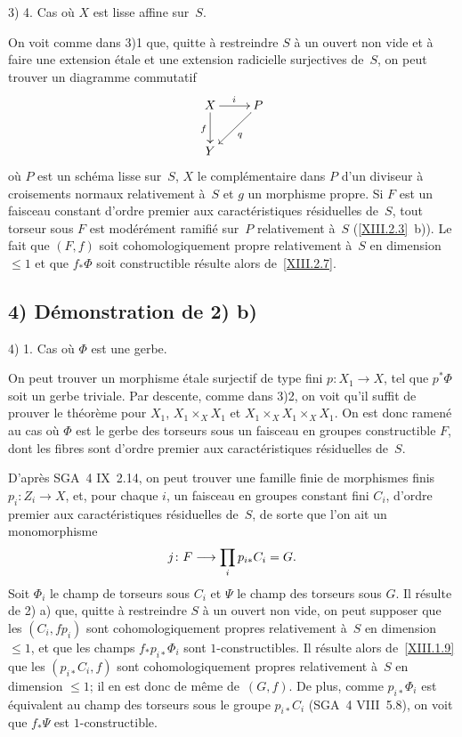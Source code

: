 3) 4. Cas o\`u $X$ est lisse affine sur~$S$.

On voit comme dans 3)1 que, quitte \`a restreindre $S$ \`a un
ouvert non vide et \`a faire une extension \'etale et une
extension radicielle surjectives de~$S$, on peut trouver un diagramme
commutatif
$$
\xymatrix{{X}\ar[r]^{i}\ar[d]_{f}&{P}\ar[ld]^{q}\\{Y}}
$$
o\`u $P$ est un sch\'ema lisse sur~$S$, $X$ le compl\'ementaire
dans $P$ d'un diviseur \`a croisements normaux relativement \`a~$S$ et $g$ un morphisme propre. Si $F$ est un faisceau constant
d'ordre premier aux caract\'eristiques r\'esiduelles de~$S$, tout
torseur sous $F$ est mod\'er\'ement ramifi\'e sur~$P$
relativement \`a~$S$ (\ref{XIII.2.3}~b)). Le fait que $(F,f)$ soit
cohomologiquement propre relativement \`a~$S$ en dimension $\le 1$
et que $f_*\Phi$ soit constructible r\'esulte alors
de~\ref{XIII.2.7}.

\subsection*{4) D\'emonstration de 2) b)}

4) 1. Cas o\`u $\Phi$ est une gerbe.

On peut trouver un morphisme \'etale surjectif de type fini $p
\colon X_1 \to X$, tel que $p^*\Phi$ soit un gerbe triviale. Par
descente, comme dans 3)2, on voit qu'il suffit de prouver le
th\'eor\`eme pour $X_1$, $X_1\times_X X_1$ et
$X_1\times_X X_1\times_X X_1$. On est donc ramen\'e au cas o\`u
$\Phi$ est le gerbe des torseurs sous un faisceau en groupes
constructible $F$, dont les fibres sont d'ordre premier aux
caract\'eristiques r\'esiduelles de~$S$.

D'apr\`es SGA~4 IX~2.14, on peut trouver une famille finie de
morphismes finis $p_i \colon Z_i \to X$, et, pour chaque $i$, un
faisceau en groupes constant fini $C_i$, d'ordre premier aux
caract\'eristiques r\'esiduelles de~$S$, de sorte que l'on ait un
monomorphisme
$$
j\colon F \to \prod_{i} p_{i*}C_i=G \quoi.
$$
Soit $\Phi_i$ le champ de torseurs sous $C_i$ et $\Psi$ le champ des
torseurs sous $G$. Il r\'esulte de 2) a) que, quitte \`a
restreindre $S$ \`a un ouvert non vide, on peut supposer que les
$(C_i,fp_i)$ sont cohomologiquement propres relativement \`a~$S$ en
dimension $\le 1$, et que les champs $f_*p_{i*}\Phi_i$ sont
$1$-constructibles. Il r\'esulte alors de~\ref{XIII.1.9} que les
$(p_{i*}C_i,f)$ sont cohomologiquement propres relativement \`a~$S$
en dimension $\le 1$; il en est donc de m\^eme de~$(G,f)$. De plus,
comme $p_{i*}\Phi_i$ est \'equivalent au champ des torseurs sous le
groupe $p_{i*}C_i$ (SGA~4 VIII~5.8), on voit que $f_*\Psi$ est
$1$-constructible.


